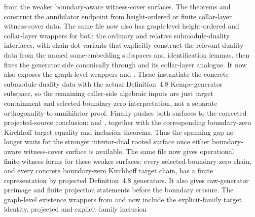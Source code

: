 \documentclass[11pt]{article}
\begin{document}
from the weaker boundary-aware witness-cover surfaces.  The theorems
and
construct the annihilator endpoint from height-ordered or finite collar-layer
witness-cover data.  The same file now also has graph-level height-ordered and
collar-layer wrappers for both the ordinary and relative submodule-duality
interfaces, with chain-dot variants that explicitly construct the relevant
duality data from the named same-embedding subspaces and identification lemmas.
 then fixes the
generator side canonically through
and its collar-layer analogue.  It now also exposes the graph-level wrappers
and
.
These instantiate the concrete submodule-duality data with the actual
Definition~4.8 Kempe-generator subspace, so the remaining caller-side algebraic
inputs are just target containment and selected-boundary-zero interpretation,
not a separate orthogonality-to-annihilator proof.  Finally
 pushes both surfaces to the corrected
projected-source conclusion:
and
,
together with the corresponding boundary-zero Kirchhoff target equality and
inclusion theorems.  Thus the spanning gap no longer waits for the stronger
interior-dual rooted surface once either boundary-aware witness-cover surface is
available.  The same file now gives operational finite-witness forms for these
weaker surfaces: every selected-boundary-zero chain, and every concrete
boundary-zero Kirchhoff target chain, has a finite representation by projected
Definition~4.8 generators.  It also gives raw-generator preimage and finite
projection statements before the boundary erasure.  The graph-level existence
wrappers from
 and
 now include the
explicit-family target identity, projected and explicit-family inclusion
\end{document}

